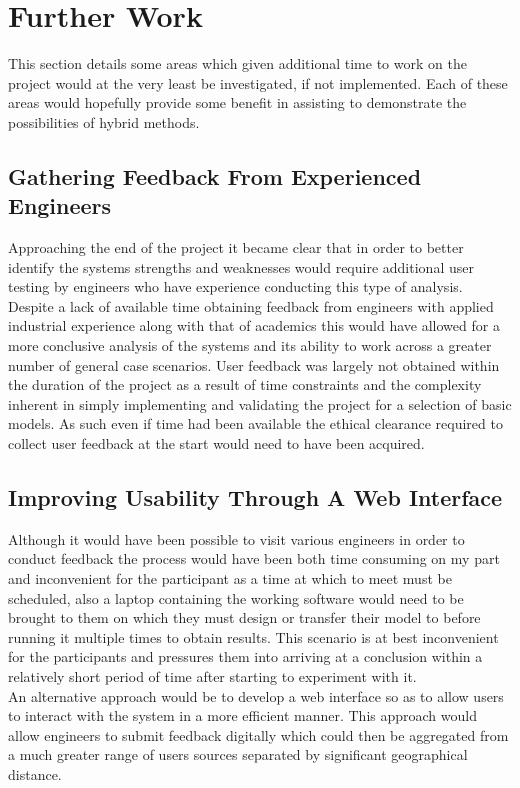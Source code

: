 
\section{Further Work}
This section details some areas which given additional time to work on the project would at the very least be investigated, if not implemented. Each of these areas would hopefully provide some benefit in assisting to demonstrate the possibilities of hybrid methods.

\subsection{Gathering Feedback From Experienced Engineers}
Approaching the end of the project it became clear that in order to better identify the systems strengths and weaknesses would require additional user testing by engineers who have experience conducting this type of analysis. Despite a lack of available time obtaining feedback from engineers with applied industrial experience along with that of academics this would have allowed for a more conclusive analysis of the systems and its ability to work across a greater number of general case scenarios. 
User feedback was largely not obtained within the duration of the project as a result of time constraints and the complexity inherent in simply implementing and validating the project for a selection of basic models. As such even if time had been available the ethical clearance required to collect user feedback at the start would need to have been acquired.


\subsection{Improving Usability Through A Web Interface}
Although it would have been possible to visit various engineers in order to conduct feedback the process would have been both time consuming on my part and inconvenient for the participant as a time at which to meet must be scheduled, also a laptop containing the working software would need to be brought to them on which they must design or transfer their model to before running it multiple times to obtain results. This scenario is at best inconvenient for the participants and pressures them into arriving at a conclusion within a relatively short period of time after starting to experiment with it. \\ 

\noindent
An alternative approach would be to develop a web interface so as to allow users to interact with the system in a more efficient manner. This approach would allow engineers to submit feedback digitally which could then be aggregated from a much greater range of users sources separated by significant geographical distance. \\\ 

